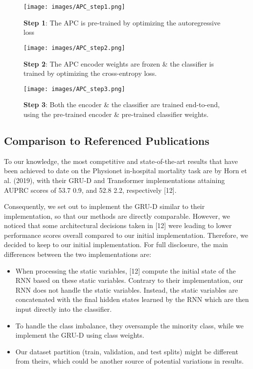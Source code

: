 \documentclass{article}
\begin{document}
\begin{figure}[t] 
\centering
\texttt{[image: images/APC\_step1.png]}
\caption{\textbf{Step 1}: The APC is pre-trained by optimizing the autoregressive loss}
\label{apc_step_1}
\end{figure}

\begin{figure}[h] 
\centering
\texttt{[image: images/APC\_step2.png]}
\caption{\textbf{Step 2}: The APC encoder weights are frozen \& the classifier is trained by optimizing the cross-entropy loss.}
\label{apc_step_2}
\end{figure}

\begin{figure}[b] 
\centering
\texttt{[image: images/APC\_step3.png]}
\caption{\textbf{Step 3}: Both the encoder \& the classifier are trained end-to-end, using the pre-trained encoder \& pre-trained classifier weights.}
\label{apc_step_3}
\end{figure}

\clearpage
\subsection{\large Comparison to Referenced Publications}
\vspace{0.5cm}
To our knowledge, the most competitive and state-of-the-art results that have been achieved to date on the Physionet in-hospital mortality task are  by Horn et al. (2019), with their GRU-D and Transformer implementations attaining AUPRC scores of 53.7  0.9, and 52.8  2.2, respectively [12].  

Consequently, we set out to implement the GRU-D similar to their implementation, so that our methods are directly comparable.
However, we noticed that some architectural decisions taken in [12] were leading to lower performance scores overall compared to our initial implementation. 
Therefore, we decided to keep to our initial implementation. 
For full disclosure, the main differences between the two implementations are:
\begin{itemize}
    \item When processing the static variables, [12] compute the initial state of the RNN based on these static variables. Contrary to their implementation, our RNN does not handle the static variables. Instead, the static variables are concatenated with the final hidden states learned by the RNN which are then input directly into the classifier.
    \item To handle the class imbalance, they oversample the minority class, while we implement the GRU-D using class weights.
    \item Our dataset partition (train, validation, and test splits) might be different from theirs, which could be another source of potential variations in results.
\end{itemize}
\end{document}
